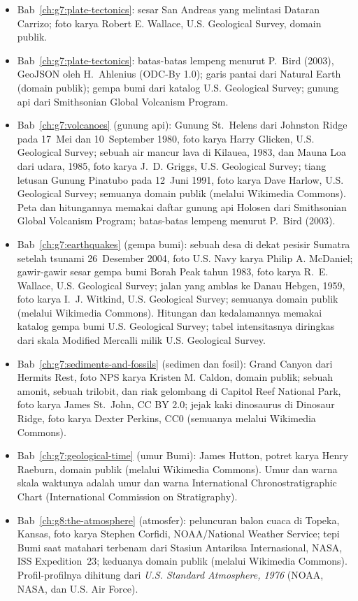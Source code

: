 \begin{itemize}
  \item Bab~\ref{ch:g7:plate-tectonics}: sesar San Andreas yang melintasi Dataran Carrizo; foto karya Robert E. Wallace, U.S. Geological Survey, domain publik.
  \item Bab~\ref{ch:g7:plate-tectonics}: batas-batas lempeng menurut P.~Bird (2003), GeoJSON oleh H.~Ahlenius (ODC-By 1.0); garis pantai dari Natural Earth (domain publik); gempa bumi dari katalog U.S. Geological Survey; gunung api dari Smithsonian Global Volcanism Program.
  \item Bab~\ref{ch:g7:volcanoes} (gunung api): Gunung St.~Helens dari Johnston Ridge pada 17~Mei dan 10~September 1980, foto karya Harry Glicken, U.S. Geological Survey; sebuah air mancur lava di Kilauea, 1983, dan Mauna Loa dari udara, 1985, foto karya J.~D. Griggs, U.S. Geological Survey; tiang letusan Gunung Pinatubo pada 12~Juni 1991, foto karya Dave Harlow, U.S. Geological Survey; semuanya domain publik (melalui Wikimedia Commons). Peta dan hitungannya memakai daftar gunung api Holosen dari Smithsonian Global Volcanism Program; batas-batas lempeng menurut P.~Bird (2003).
  \item Bab~\ref{ch:g7:earthquakes} (gempa bumi): sebuah desa di dekat pesisir Sumatra setelah tsunami 26~Desember 2004, foto U.S. Navy karya Philip A. McDaniel; gawir-gawir sesar gempa bumi Borah Peak tahun 1983, foto karya R.~E. Wallace, U.S. Geological Survey; jalan yang amblas ke Danau Hebgen, 1959, foto karya I.~J. Witkind, U.S. Geological Survey; semuanya domain publik (melalui Wikimedia Commons). Hitungan dan kedalamannya memakai katalog gempa bumi U.S. Geological Survey; tabel intensitasnya diringkas dari skala Modified Mercalli milik U.S. Geological Survey.
  \item Bab~\ref{ch:g7:sediments-and-fossils} (sedimen dan fosil): Grand Canyon dari Hermits Rest, foto NPS karya Kristen M. Caldon, domain publik; sebuah amonit, sebuah trilobit, dan riak gelombang di Capitol Reef National Park, foto karya James St.~John, CC BY 2.0; jejak kaki dinosaurus di Dinosaur Ridge, foto karya Dexter Perkins, CC0 (semuanya melalui Wikimedia Commons).
  \item Bab~\ref{ch:g7:geological-time} (umur Bumi): James Hutton, potret karya Henry Raeburn, domain publik (melalui Wikimedia Commons). Umur dan warna skala waktunya adalah umur dan warna International Chronostratigraphic Chart (International Commission on Stratigraphy).
  \item Bab~\ref{ch:g8:the-atmosphere} (atmosfer): peluncuran balon cuaca di Topeka, Kansas, foto karya Stephen Corfidi, NOAA/National Weather Service; tepi Bumi saat matahari terbenam dari Stasiun Antariksa Internasional, NASA, ISS Expedition~23; keduanya domain publik (melalui Wikimedia Commons). Profil-profilnya dihitung dari \emph{U.S. Standard Atmosphere, 1976} (NOAA, NASA, dan U.S. Air Force).

\end{itemize}
